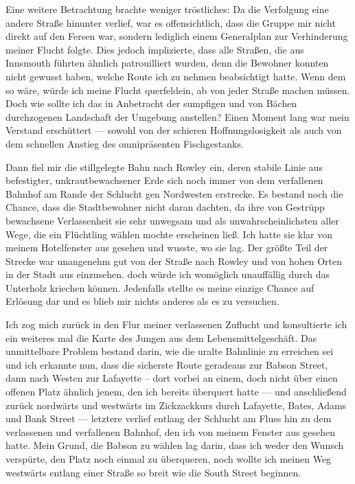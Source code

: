 Eine weitere Betrachtung brachte weniger tröstliches: Da die Verfolgung eine andere Straße hinunter verlief, war es offensichtlich, dass die Gruppe mir nicht direkt auf den Fersen war, sondern lediglich einem Generalplan zur Verhinderung meiner Flucht folgte. Dies jedoch implizierte, dass alle Straßen, die aus Innsmouth führten ähnlich patrouilliert wurden, denn die Bewohner konnten nicht gewusst haben, welche Route ich zu nehmen beabsichtigt hatte. Wenn dem so wäre, würde ich meine Flucht querfeldein, ab von jeder Straße machen müssen. Doch wie sollte ich das in Anbetracht der sumpfigen und von Bächen durchzogenen Landschaft der Umgebung anstellen? Einen Moment lang war mein Verstand erschüttert --- sowohl von der schieren Hoffnungslosigkeit als auch von dem schnellen Anstieg des omnipräsenten Fischgestanks.

Dann fiel mir die stillgelegte Bahn nach Rowley ein, deren stabile Linie aus befestigter, unkrautbewachsener Erde sich noch immer von dem verfallenen Bahnhof am Rande der Schlucht gen Nordwesten erstrecke. Es bestand noch die Chance, dass die Stadtbewohner nicht daran dachten, da ihre von Gestrüpp bewachsene Verlassenheit sie sehr unwegsam und als unwahrscheinlichsten aller Wege, die ein Flüchtling wählen mochte erscheinen ließ. Ich hatte sie klar von meinem Hotelfenster aus gesehen und wusste, wo sie lag. Der größte Teil der Strecke war unangenehm gut von der Straße nach Rowley und von hohen Orten in der Stadt aus einzusehen. doch würde ich womöglich unauffällig durch das Unterholz kriechen können. Jedenfalls stellte es meine einzige Chance auf Erlösung dar und es blieb mir nichts anderes als es zu versuchen.

Ich zog mich zurück in den Flur meiner verlassenen Zuflucht und konsultierte ich ein weiteres mal die Karte des Jungen aus dem Lebensmittelgeschäft. Das unmittelbare Problem bestand darin, wie die uralte Bahnlinie zu erreichen sei und ich erkannte nun, dass die sicherste Route geradeaus zur Babson Street, dann nach Westen zur Lafayette -- dort vorbei an einem, doch nicht über einen offenen Platz ähnlich jenem, den ich bereits überquert hatte --- und anschließend zurück nordwärts und westwärts im Zickzackkurs durch Lafayette, Bates, Adams und Bank Street --- letztere verlief entlang der Schlucht am Fluss hin zu dem verlassenen und verfallenen Bahnhof, den ich von meinem Fenster aus gesehen hatte. Mein Grund, die Babson zu wählen lag darin, dass ich weder den Wunsch verspürte, den Platz noch einmal zu überqueren, noch wollte ich meinen Weg westwärts entlang einer Straße so breit wie die South Street beginnen.


